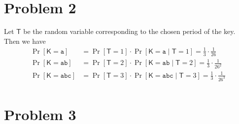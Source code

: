 \documentclass[12pt]{article}
\numberwithin{equation}{section}
\theoremstyle{plain}
\DeclareMathOperator*{\prob}{Pr}
\newcommand{\given}{\mid}
\newcommand{\key}{\algo{K}}
\newcommand{\algo}[1]{\mathsf{#1}}
\begin{document}
\section*{Problem 2}

\newcommand{\period}{\algo{T}}

Let $\period$ be the random variable corresponding to the chosen period of the key.
Then we have
\begin{align*}
    \prob[\key = \texttt{a}]
        &= \prob[\period = 1] \cdot \prob[\key = \texttt{a} \given \period = 1] = \frac{1}{3} \cdot \frac{1}{26}\\
    \prob[\key = \texttt{ab}]
        &= \prob[\period = 2] \cdot \prob[\key = \texttt{ab} \given \period = 2] = \frac{1}{3} \cdot \frac{1}{26^2}\\
    \prob[\key = \texttt{abc}]
        &= \prob[\period = 3] \cdot \prob[\key = \texttt{abc} \given \period = 3] = \frac{1}{3} \cdot \frac{1}{26^3}\\
\end{align*}

\let\period\undefined

\section*{Problem 3}
\end{document}
